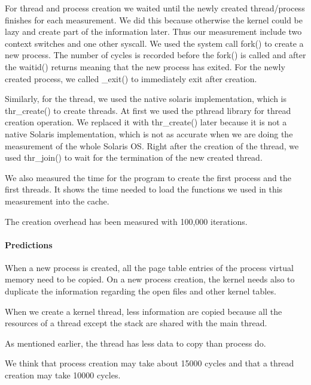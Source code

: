 For thread and process creation we waited until the newly created thread/process
finishes for each measurement.
We did this because otherwise the kernel could be lazy and create part of
the information later.
Thus our measurement include two context switches and one other syscall.
We used the system call fork() to create a new process.
The number of cycles is recorded before the fork() is called and after the waitid()
returns meaning that the new process has exited.
For the newly created process, we called \_exit() to immediately exit after creation.

Similarly, for the thread, we used the native solaris implementation,
which is thr\_create() to create threads.
At first we used the pthread library for thread creation operation.
We replaced it with thr\_create() later because it is not a native Solaris
implementation, which is not as accurate when we are doing the measurement
of the whole Solaris OS.
Right after the creation of the thread, we used thr\_join() to wait for the
termination of the new created thread.

We also measured the time for the program to create the first process and the
first threads.
It shows the time needed to load the functions we used in this measurement into the cache.

The creation overhead has been measured with 100,000 iterations.

\paragraph{Predictions}

When a new process is created, all the page table entries of the process virtual
memory need to be copied.
On a new process creation, the kernel needs also to duplicate the information
regarding the open files and other kernel tables.

When we create a kernel thread, less information are copied because all the
resources of a thread except the stack are shared with the main thread.

As mentioned earlier, the thread has less data to copy than process do.

We think that process creation may take about 15000 cycles and that a thread
creation may take 10000 cycles.


